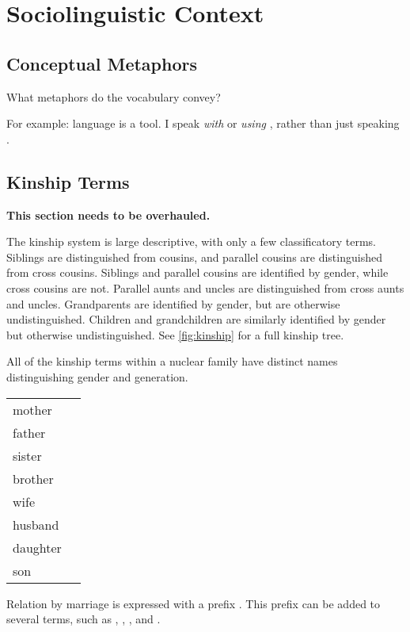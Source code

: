\chapter{Sociolinguistic Context}
\label{app:tvk-sociolinguistic-context}

\section{Conceptual Metaphors}
\label{sec:tvk-conceptual-metaphors}

What metaphors do the vocabulary convey?

For example: language is a tool. I speak \textit{with} or \textit{using} \langtvk, rather than just speaking \langtvk.

\section{Kinship Terms}
\label{sec:tvk-kinship-terms}

\textbf{This section needs to be overhauled.}

The \langtvk{} kinship system is large descriptive, with only a few classificatory terms. Siblings are distinguished from cousins, and parallel cousins are distinguished from cross cousins. Siblings and parallel cousins are identified by gender, while cross cousins are not. Parallel aunts and uncles are distinguished from cross aunts and uncles. Grandparents are identified by gender, but are otherwise undistinguished. Children and grandchildren are similarly identified by gender but otherwise undistinguished. See \autoref{fig:kinship} for a full kinship tree.

All of the kinship terms within a nuclear family have distinct names distinguishing gender and generation.

\exdisplay\noexno
\begin{tabu} {l l}
	mother & \\
	father & \\
	sister & \\
	brother & \\
	wife & \\
	husband & \\
	daughter & \\
	son & \\
\end{tabu}
\xe

Relation by marriage is expressed with a prefix . This prefix can be added to several terms, such as , , , and .

